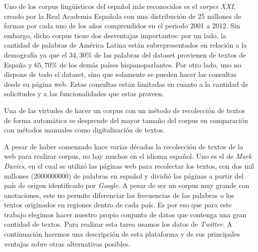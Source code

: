 Uno de los corpus lingüísticos del español más reconocidos es el \emph{corpes XXI}\cite{espanolabanco}, creado por la Real Academia Española con una distribución de 25 millones de formas por cada uno de los años comprendidos en el periodo 2001 
a 2012. Sin embargo, dicho corpus tiene dos desventajas importantes: por un
lado, la cantidad de palabras de América Latina están subrepresentados en relación a la demografía ya que el $34,30$\% de las palabras del dataset provienen de textos de España y $65,70$\% de los demás países hispanoparlantes. Por otro lado, uno no dispone de todo el dataset, sino que solamente se pueden hacer las consultas desde su página web. Estas consultas están limitadas en cuanto a la cantidad de solicitudes y a las funcionalidades que estas proveen.

Una de las virtudes de hacer un corpus con un método de recolección de textos de forma automática se desprende del mayor tamaño del corpus en comparación con métodos manuales como digitalización de textos.

A pesar de haber comenzado hace varias décadas la recolección de textos de la web para realizar corpus, no hay muchos en el idioma español.
Uno es el de \textit{Mark Davies}, en el cual se utilizó las páginas web para recolectar los textos, con dos mil millones (2000000000) de palabras en español y dividió las páginas a partir del país de origen identificado por \textit{Google}. A pesar de ser un corpus muy grande con anotaciones, este no permite diferenciar las frecuencias de las palabras o los textos originados en regiones dentro de cada país. Es por eso que para este trabajo elegimos hacer nuestro propio conjunto de datos que contenga una gran cantidad de textos. Para realizar esta tarea usamos los datos de \textit{Twitter}. A continuación haremos una descripción de esta plataforma y de sus principales ventajas sobre otras alternativas posibles.

